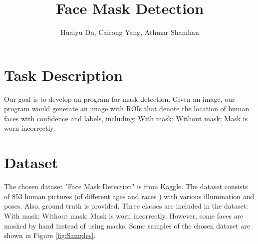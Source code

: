 \documentclass[10pt,a4paper]{report}
\author{Huaiyu Du, Cairong Yang, Athmar Shamhan}
\begin{document}
\title{Face Mask Detection}

\maketitle

\chapter{Task Description}
Our goal is to develop an program for mask detection. Given an image, our program would generate an image with ROIs that denote the location of human faces with confidence and labels, including: With mask; Without mask; Mask is worn incorrectly.

\chapter{Dataset}
The chosen dataset "Face Mask Detection" \cite{facemd} is from Kaggle. The dataset consists of 853 human pictures (of different ages and races ) with various illumination and poses. Also, ground truth is provided. Three classes are included in the dataset: With mask; Without mask; Mask is worn incorrectly. However, some faces are masked by hand instead of using masks. Some samples of the chosen dataset are shown in Figure \ref{fig:Samples}.
\end{document}

